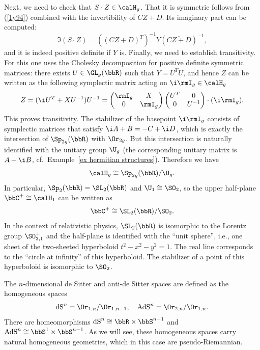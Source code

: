 \begin{example}
    Next, we need to check that $S\cdot Z\in \calH_g$. That it is symmetric follows from (\ref{1y94}) combined with the invertibility of $CZ+D$. Its imaginary part can be computed:
    \[\Im (S\cdot Z)=((CZ+D)^T)^{-1}Y(\overline{CZ+D})^{-1},\]
    and it is indeed positive definite if $Y$ is. Finally, we need to establish transitivity. For this one uses the Cholesky decomposition for positive definite symmetric matrices: there exists $U\in\GL_g(\bbR)$ such that $Y=U^TU$, and hence $Z$ can be written as the following symplectic matrix acting on $\i \rmI_g\in \calH_g$
    \[Z=(\i U^T+XU^{-1})U^{-1}=\begin{pmatrix}
        \rmI_g & X\\
        0 & \rmI_g
    \end{pmatrix}\begin{pmatrix}
        U^T & 0\\
        0 & U^{-1}
    \end{pmatrix}\cdot(\i \rmI_g).\]
    This proves transitivity. The stabilizer of the basepoint $\i \rmI_g$ consists of symplectic matrices that satisfy $\i A+B=-C+\i D$, which is exactly the intersection of $\Sp_{2g}(\bbR)$ with $\Or_{2g}$. But this intersection is naturally identified with the unitary group $\U_g$ (the corresponding unitary matrix is $A+\i B$, cf.\ Example~\ref{ex hermitian structures}). Therefore we have 
    \[\calH_g \cong \Sp_{2g}(\bbR)\slash \U_g.\]
    In particular, $\Sp_2(\bbR)=\SL_2(\bbR)$ and $\U_1\cong\SO_2$, so the upper half-plane $\bbC^+\cong \calH_1$ can be written as 
    \[\bbC^+\cong\SL_2(\bbR)\slash \SO_2.\]
    In the context of relativistic physics, $\SL_2(\bbR)$ is isomorphic to the Lorentz group $\SO^+_{2,1}$ and the half-plane is identified with the ``unit sphere'', i.e., one sheet of the two-sheeted hyperboloid $t^2-x^2-y^2=1$. The real line corresponds to the ``circle at infinity'' of this hyperboloid. The stabilizer of a point of this hyperboloid is isomorphic to $\SO_2$.
\end{example}

\begin{example}\label{ex dS and AdS}
    The $n$-dimensional de Sitter and anti-de Sitter spaces are defined as the homogeneous spaces 
    \[\mathrm{dS}^n=\Or_{1,n}\slash \Or_{1,n-1},\quad \mathrm{AdS}^n=\Or_{2,n}\slash \Or_{1,n}.\]
    There are homeomorphisms $\mathrm{dS}^n\cong \bbR\times\bbS^{n-1}$ and $\mathrm{AdS}^n\cong \bbS^1\times\bbS^{n-1}$. As we will see, these homogeneous spaces carry natural homogeneous geometries, which in this case are pseudo-Riemannian.
\end{example}


